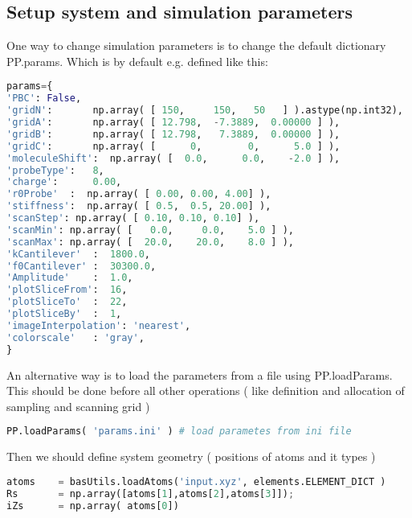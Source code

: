 \subsection{Setup system and simulation parameters}

One way to change simulation parameters is to change the default dictionary
PP.params. Which is by default e.g. defined like this:


\begin{shadedbox}
    \begin{lstlisting}[language=python]
params={
'PBC': False,
'gridN':       np.array( [ 150,     150,   50   ] ).astype(np.int32),
'gridA':       np.array( [ 12.798,  -7.3889,  0.00000 ] ),
'gridB':       np.array( [ 12.798,   7.3889,  0.00000 ] ),
'gridC':       np.array( [      0,        0,      5.0 ] ),
'moleculeShift':  np.array( [  0.0,      0.0,    -2.0 ] ),
'probeType':   8,
'charge':      0.00,
'r0Probe'  :  np.array( [ 0.00, 0.00, 4.00] ),
'stiffness':  np.array( [ 0.5,  0.5, 20.00] ),
'scanStep': np.array( [ 0.10, 0.10, 0.10] ),
'scanMin': np.array( [   0.0,     0.0,    5.0 ] ),
'scanMax': np.array( [  20.0,    20.0,    8.0 ] ),
'kCantilever'  :  1800.0, 
'f0Cantilever' :  30300.0,
'Amplitude'    :  1.0,
'plotSliceFrom':  16,
'plotSliceTo'  :  22,
'plotSliceBy'  :  1,
'imageInterpolation': 'nearest',
'colorscale'   : 'gray',
}
   \end{lstlisting}
\end{shadedbox}

An alternative way is to load the parameters from a file using PP.loadParams.
This should be done before all other operations ( like definition and allocation
of sampling and scanning grid )




\begin{shadedbox}
    \begin{lstlisting}[language=python]
PP.loadParams( 'params.ini' ) # load parametes from ini file
   \end{lstlisting}
\end{shadedbox}


Then we should define system geometry ( positions of atoms and it types )
\begin{shadedbox}
    \begin{lstlisting}[language=python]
atoms    = basUtils.loadAtoms('input.xyz', elements.ELEMENT_DICT )
Rs       = np.array([atoms[1],atoms[2],atoms[3]]);  
iZs      = np.array( atoms[0])
   \end{lstlisting}
\end{shadedbox}




